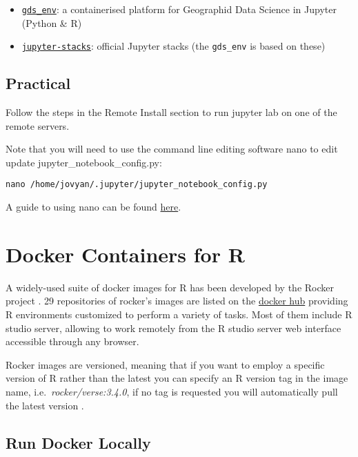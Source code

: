 \documentclass[
]{book}
\providecommand{\tightlist}{%
  \setlength{\itemsep}{0pt}\setlength{\parskip}{0pt}}
\begin{document}
\begin{itemize}
\tightlist
\item
  \href{https://github.com/darribas/gds_env}{\texttt{gds\_env}}: a containerised platform
  for Geographid Data Science in Jupyter (Python \& R)
\item
  \href{https://github.com/jupyter/docker-stacks}{\texttt{jupyter-stacks}}: official
  Jupyter stacks (the \texttt{gds\_env} is based on these)
\end{itemize}

\hypertarget{practical-2}{%
\section{Practical}\label{practical-2}}

Follow the steps in the Remote Install section to run jupyter lab on one of the remote servers.

Note that you will need to use the command line editing software nano to edit update jupyter\_notebook\_config.py:

\begin{verbatim}
nano /home/jovyan/.jupyter/jupyter_notebook_config.py
\end{verbatim}

A guide to using nano can be found \href{https://www.howtogeek.com/howto/42980/the-beginners-guide-to-nano-the-linux-command-line-text-editor/}{here}.

\hypertarget{docker-containers-for-r}{%
\chapter{Docker Containers for R}\label{docker-containers-for-r}}

A widely-used suite of docker images for R has been developed by the Rocker project \citep{RJ-2017-065}. 29 repositories of rocker's images are listed on the \href{https://hub.docker.com/u/rocker/}{docker hub} providing R environments customized to perform a variety of tasks. Most of them include R studio server, allowing to work remotely from the R studio server web interface accessible through any browser.

Rocker images are versioned, meaning that if you want to employ a specific version of R rather than the latest you can specify an R version tag in the image name, i.e.~\emph{rocker/verse:3.4.0}, if no tag is requested you will automatically pull the latest version \citep{RJ-2017-065}.

\hypertarget{run-docker-locally}{%
\section{Run Docker Locally}\label{run-docker-locally}}
\end{document}
